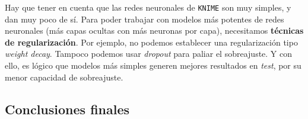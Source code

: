 \documentclass[11pt]{article}
\begin{document}
Hay que tener en cuenta que las redes neuronales de \lstinline{KNIME} son muy simples, y dan muy poco de sí. Para poder trabajar con modelos más potentes de redes neuronales (más capas ocultas con más neuronas por capa), necesitamos \textbf{técnicas de regularización}. Por ejemplo, no podemos establecer una regularización tipo \emph{weight decay}. Tampoco podemos usar \emph{dropout} para paliar el sobreajuste. Y con ello, es lógico que modelos más simples generen mejores resultados en \emph{test}, por su menor capacidad de sobreajuste.

\pagebreak

\subsection{Conclusiones finales}


\pagebreak



\end{document}

